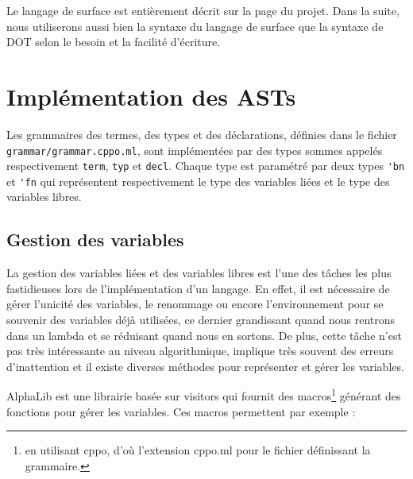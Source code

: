 
Le langage de surface est entièrement décrit sur la page du
projet\cite{rml-github}. Dans la suite, nous
utiliserons aussi bien la syntaxe du langage de surface que la syntaxe de DOT
selon le besoin et la facilité d'écriture.

\section{Implémentation des ASTs}

Les grammaires des termes, des types et des déclarations, définies dans le
fichier \verb|grammar/grammar.cppo.ml|, sont implémentées par des types sommes
appelés respectivement \verb|term|, \verb|typ| et \verb|decl|. Chaque type est
paramétré par deux types \verb|'bn| et \verb|'fn| qui représentent
respectivement le type des variables liées et le type des variables libres.

\subsection*{Gestion des variables}

La gestion des variables liées et des variables libres est l'une des tâches les plus
fastidieuses lors de l'implémentation d'un langage. En effet, il
est nécessaire de gérer l'unicité des variables, le renommage ou encore l'environnement
pour se souvenir des variables déjà utilisées, ce dernier grandissant quand nous
rentrons dans un lambda et se réduisant quand nous en sortons. De plus,
cette tâche n'est pas très intéressante au niveau algorithmique, implique très
souvent des erreurs d'inattention et il existe diverses méthodes pour
représenter et gérer les variables.

AlphaLib\cite{alphalib} est une librairie basée sur
visitors\cite{visitors} qui fournit des macros\footnote{en utilisant
  cppo, d'où l'extension cppo.ml pour le fichier définissant la grammaire.}
générant des fonctions pour gérer les variables. Ces macros permettent par
exemple :

